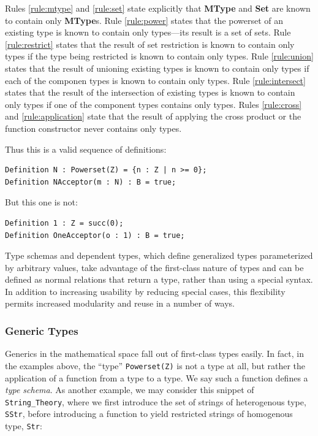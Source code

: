 Rules \ref{rule:mtype} and \ref{rule:set} state explicitly that \textbf{MType} and \textbf{Set} are known to contain only \textbf{MType}s.  Rule \ref{rule:power} states that the powerset of an existing type is known to contain only types---its result is a set of sets.  Rule \ref{rule:restrict} states that the result of set restriction is known to contain only types if the type being restricted is known to contain only types.  Rule \ref{rule:union} states that the result of unioning existing types is known to contain only types if each of the componen types is known to contain only types.  Rule \ref{rule:intersect} states that the result of the intersection of existing types is known to contain only types if one of the component types contains only types.  Rules \ref{rule:cross} and \ref{rule:application} state that the result of applying the cross product or the function constructor never contains only types.

Thus this is a valid sequence of definitions:

\begin{lstlisting}
Definition N : Powerset(Z) = {n : Z | n >= 0};
Definition NAcceptor(m : N) : B = true;
\end{lstlisting}

But this one is not:

\begin{lstlisting}
Definition 1 : Z = succ(0);
Definition OneAcceptor(o : 1) : B = true;
\end{lstlisting}

Type schemas and dependent types, which define generalized types parameterized by arbitrary values, take advantage of the first-class nature of types and can be defined as normal relations that return a type, rather than using a special syntax.  In addition to increasing usability by reducing special cases, this flexibility permits increased modularity and reuse in a number of ways.

		\subsubsection{Generic Types\label{genericTypes}}

Generics in the mathematical space fall out of first-class types easily.  In fact, in the examples above, the ``type'' \texttt{Powerset(Z)} is not a type at all, but rather the application of a function from a type to a type.  We say such a function defines a \emph{type schema}.  As another example, we may consider this snippet of \texttt{String\_Theory}, where we first introduce the set of strings of heterogenous type, \texttt{SStr}, before introducing a function to yield restricted strings of homogenous type, \texttt{Str}:

